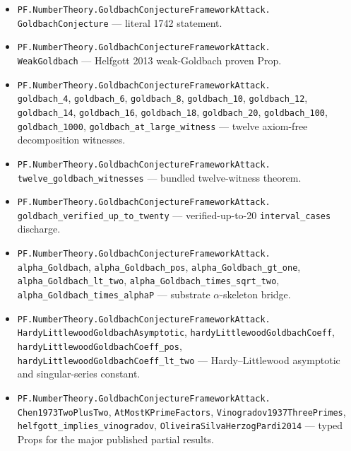 \documentclass[11pt,a4paper]{article}
\theoremstyle{plain}
\theoremstyle{definition}
\begin{document}
\begin{itemize}[leftmargin=*,nosep]
\item \texttt{PF.NumberTheory.GoldbachConjectureFrameworkAttack.\\
  GoldbachConjecture} --- literal 1742 statement.
\item \texttt{PF.NumberTheory.GoldbachConjectureFrameworkAttack.\\
  WeakGoldbach} --- Helfgott 2013 weak-Goldbach proven Prop.
\item \texttt{PF.NumberTheory.GoldbachConjectureFrameworkAttack.\\
  goldbach\_4},
  \texttt{goldbach\_6},
  \texttt{goldbach\_8},
  \texttt{goldbach\_10},
  \texttt{goldbach\_12},
  \texttt{goldbach\_14},
  \texttt{goldbach\_16},
  \texttt{goldbach\_18},
  \texttt{goldbach\_20},
  \texttt{goldbach\_100},
  \texttt{goldbach\_1000},
  \texttt{goldbach\_at\_large\_witness}
  --- twelve axiom-free decomposition witnesses.
\item \texttt{PF.NumberTheory.GoldbachConjectureFrameworkAttack.\\
  twelve\_goldbach\_witnesses}
  --- bundled twelve-witness theorem.
\item \texttt{PF.NumberTheory.GoldbachConjectureFrameworkAttack.\\
  goldbach\_verified\_up\_to\_twenty}
  --- verified-up-to-20 \texttt{interval\_cases} discharge.
\item \texttt{PF.NumberTheory.GoldbachConjectureFrameworkAttack.\\
  alpha\_Goldbach},
  \texttt{alpha\_Goldbach\_pos},
  \texttt{alpha\_Goldbach\_gt\_one},
  \texttt{alpha\_Goldbach\_lt\_two},
  \texttt{alpha\_Goldbach\_times\_sqrt\_two},
  \texttt{alpha\_Goldbach\_times\_alphaP}
  --- substrate $\alpha$-skeleton bridge.
\item \texttt{PF.NumberTheory.GoldbachConjectureFrameworkAttack.\\
  HardyLittlewoodGoldbachAsymptotic},
  \texttt{hardyLittlewoodGoldbachCoeff},
  \texttt{hardyLittlewoodGoldbachCoeff\_pos},
  \texttt{hardyLittlewoodGoldbachCoeff\_lt\_two}
  --- Hardy--Littlewood asymptotic and singular-series constant.
\item \texttt{PF.NumberTheory.GoldbachConjectureFrameworkAttack.\\
  Chen1973TwoPlusTwo},
  \texttt{AtMostKPrimeFactors},
  \texttt{Vinogradov1937ThreePrimes},
  \texttt{helfgott\_implies\_vinogradov},
  \texttt{OliveiraSilvaHerzogPardi2014}
  --- typed Props for the major published partial results.

\end{itemize}
\end{document}
